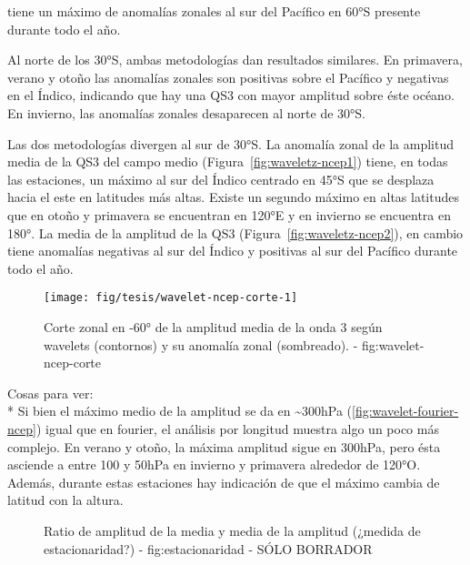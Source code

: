 \documentclass[spanish,a4paper]{book}
\begin{document}
tiene un máximo de anomalías zonales al sur del Pacífico en 60°S
presente durante todo el año.

Al norte de los 30°S, ambas metodologías dan resultados similares. En
primavera, verano y otoño las anomalías zonales son positivas sobre el
Pacífico y negativas en el Índico, indicando que hay una QS3 con mayor
amplitud sobre éste océano. En invierno, las anomalías zonales
desaparecen al norte de 30°S.

Las dos metodologías divergen al sur de 30°S. La anomalía zonal de la
amplitud media de la QS3 del campo medio
(Figura~\ref{fig:waveletz-ncep1}) tiene, en todas las estaciones, un
máximo al sur del Índico centrado en 45°S que se desplaza hacia el este
en latitudes más altas. Existe un segundo máximo en altas latitudes que
en otoño y primavera se encuentran en 120°E y en invierno se encuentra
en 180°. La media de la amplitud de la QS3
(Figura~\ref{fig:waveletz-ncep2}), en cambio tiene anomalías negativas
al sur del Índico y positivas al sur del Pacífico durante todo el año.


\begin{landscape}\begin{figure}

{\centering \texttt{[image: fig/tesis/wavelet-ncep-corte-1]} 

}

\caption{Corte zonal en -60° de la amplitud media de la onda 3 según wavelets (contornos) y su anomalía zonal (sombreado). - fig:wavelet-ncep-corte}\label{fig:wavelet-ncep-corte}
\end{figure}
\end{landscape}

Cosas para ver:\\
* Si bien el máximo medio de la amplitud se da en
\textasciitilde{}300hPa (\autoref{fig:wavelet-fourier-ncep}) igual que
en fourier, el análisis por longitud muestra algo un poco más complejo.
En verano y otoño, la máxima amplitud sigue en 300hPa, pero ésta
asciende a entre 100 y 50hPa en invierno y primavera alrededor de 120°O.
Además, durante estas estaciones hay indicación de que el máximo cambia
de latitud con la altura.

\begin{figure*}
\newline{}\caption{Ratio de amplitud de la media y media de la amplitud (¿medida de estacionaridad?) - fig:estacionaridad - SÓLO BORRADOR}\label{fig:estacionaridad}
\end{figure*}
\end{document}
